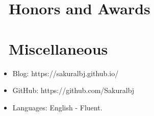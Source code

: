 \documentclass{resume}
\begin{document}
\section{\faHeartO\ Honors and Awards}

\section{\faInfo\ Miscellaneous}
\begin{itemize}[parsep=0.5ex]
  \item Blog: https://sakuralbj.github.io/
  \item GitHub: https://github.com/Sakuralbj
  \item Languages: English - Fluent.
\end{itemize}

%
%
\end{document}
